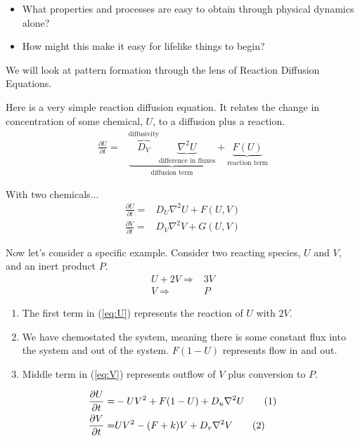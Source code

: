 \documentclass[]{article}
\newcommand\numberthis{\addtocounter{equation}{1}\tag{\theequation}}
\begin{document}
\begin{itemize}
	\item What properties and processes are easy to obtain through physical dynamics alone?	
	\item How might this make it easy for lifelike things to begin?
\end{itemize}

We will look at pattern formation through the lens of Reaction Diffusion Equations\cite{sfi_grayscott2018}.

Here is a very simple reaction diffusion equation. It relates the change in concentration of some chemical,  $U$, to a diffusion plus a reaction.
\begin{align*}
\frac{\partial U}{\partial t} =&   \underbrace{\overbrace{D_V}^\text{diffusivity} \underbrace{ \nabla^2 U }_\text{difference in fluxes}}_\text{diffusion term} + \underbrace{ F(U)}_\text{reaction term}
\end{align*}

With two chemicals...
\begin{align*}
\frac{\partial U}{\partial t} =&   D_U \nabla^2 U + F(U,V)\\
\frac{\partial V}{\partial t} =&   D_V \nabla^2 V + G(U,V)
\end{align*}

Now let's consider a specific example.
Consider two reacting species, $U$ and $V$, and an inert product $P$.
\begin{align*}
U + 2V \Longrightarrow& 3V\\
V \Longrightarrow& P
\end{align*}

\begin{enumerate}
	\item The first term in (\ref{eq:U}) represents the reaction of $U$ with $2V$. 
	\item We have chemostated the system, meaning there is some constant flux into the system and out of the system. $F(1 - U)$ represents flow in and out.
	\item Middle term in (\ref{eq:V}) represents outflow of $V$ plus conversion to $P$.
\end{enumerate}
\begin{align*}
	\frac{\partial U}{\partial t} =& -U V^2 + F(1 - U)  + D_u \nabla^2 U \numberthis \label{eq:U}\\
	\frac{\partial V}{\partial t} =& U V^2 - (F +k) V + D_v \nabla^2 V \numberthis \label{eq:V}
\end{align*}
\end{document}
